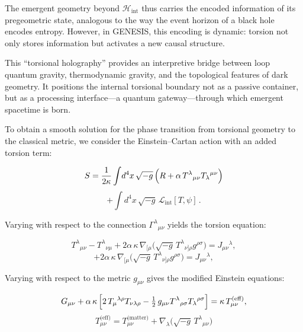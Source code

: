 \documentclass{article}
\begin{document}
The emergent geometry beyond $\mathcal{H}_{\text{int}}$ thus carries the encoded information of its pregeometric state, analogous to the way the event horizon of a black hole encodes entropy. However, in GENESIS, this encoding is dynamic: torsion not only stores information but activates a new causal structure.

This ``torsional holography'' provides an interpretive bridge between loop quantum gravity, thermodynamic gravity, and the topological features of dark geometry. It positions the internal torsional boundary not as a passive container, but as a processing interface---a quantum gateway---through which emergent spacetime is born.

To obtain a smooth solution for the phase transition from torsional geometry to the classical metric, we consider the Einstein–Cartan action with an added torsion term:

\begin{equation}\label{eq:auto61}
S = \frac{1}{2\kappa}\int \! d^4x\,\sqrt{-g}\,\Bigl(R + \alpha\,T^{\lambda}{}_{\mu\nu}T_{\lambda}{}^{\mu\nu}\Bigr)
\end{equation}
\begin{equation}\label{eq:auto62}
+ \int \! d^4x\,\sqrt{-g}\,\mathcal{L}_{\text{int}}[T,\psi]\,.
\end{equation}

Varying with respect to the connection $\Gamma^\lambda{}_{\mu\nu}$ yields the torsion equation:

\begin{equation}\label{eq:auto63}
T^{\lambda}{}_{\mu\nu} - T^{\lambda}{}_{\nu\mu}
+ 2\alpha\,\kappa\,\nabla_{[\mu}\bigl(\sqrt{-g}\,T^{\lambda}{}_{\nu]\rho}g^{\rho\sigma}\bigr) = J_{\mu\nu}{}^\lambda,
\end{equation}
\begin{equation}\label{eq:auto64}
+ 2\alpha\,\kappa\,\nabla_{[\mu}\bigl(\sqrt{-g}\,T^{\lambda}{}_{\nu]\rho}g^{\rho\sigma}\bigr) = J_{\mu\nu}{}^\lambda,
\end{equation}

Varying with respect to the metric $g_{\mu\nu}$ gives the modified Einstein equations:

\begin{equation}\label{eq:auto65}
G_{\mu\nu} + \alpha\,\kappa\,\Bigl[2\,T_{\mu}{}^{\lambda\rho}T_{\nu\lambda\rho}
- \tfrac12\,g_{\mu\nu}T^{\lambda}{}_{\rho\sigma}T_{\lambda}{}^{\rho\sigma}\Bigr]
= \kappa\,T_{\mu\nu}^{\text{(eff)}},
\end{equation}
\begin{equation}\label{eq:auto66}
T_{\mu\nu}^{\text{(eff)}}
= T_{\mu\nu}^{\text{(matter)}} 
+ \nabla_\lambda\bigl(\sqrt{-g}\,T^\lambda{}_{\mu\nu}\bigr)
\end{equation}
\end{document}
